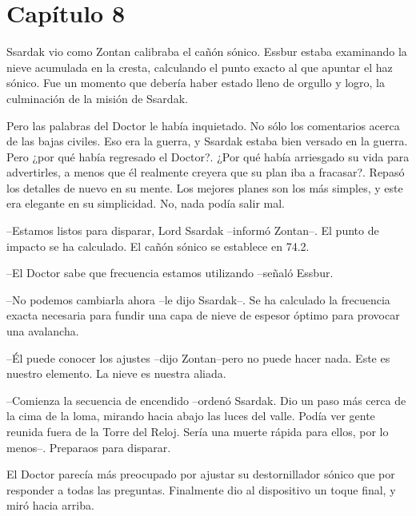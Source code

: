 \chapter*{Capítulo 8}

Ssardak vio como Zontan calibraba el cañón sónico. Essbur estaba examinando la nieve acumulada en la cresta, calculando el punto exacto al que apuntar el haz sónico. Fue un momento que debería haber estado lleno de orgullo y logro, la culminación de la misión de Ssardak.



Pero las palabras del Doctor le había inquietado. No sólo los comentarios acerca de las bajas civiles. Eso era la guerra, y Ssardak estaba bien versado en la guerra. Pero ¿por qué había regresado el Doctor?. ¿Por qué había arriesgado su vida para advertirles, a menos que él realmente creyera que su plan iba a fracasar?. Repasó los detalles de nuevo en su mente. Los mejores planes son los más simples, y este era elegante en su simplicidad. No, nada podía salir mal.



--Estamos listos para disparar, Lord Ssardak --informó Zontan--. El punto de impacto se ha calculado. El cañón sónico se establece en 74.2.



--El Doctor sabe que frecuencia estamos utilizando --señaló Essbur.



--No podemos cambiarla ahora --le dijo Ssardak--. Se ha calculado la frecuencia exacta necesaria para fundir una capa de nieve de espesor óptimo para provocar una avalancha.



--Él puede conocer los ajustes --dijo Zontan--pero no puede hacer nada. Este es nuestro elemento. La nieve es nuestra aliada. 



--Comienza la secuencia de encendido --ordenó Ssardak. Dio un paso más cerca de la cima de la loma, mirando hacia abajo las luces del valle. Podía ver gente reunida fuera de la Torre del Reloj. Sería una muerte rápida para ellos, por lo menos--. Preparaos para disparar.



\mbox{}



El Doctor parecía más preocupado por ajustar su destornillador sónico que por responder a todas las preguntas. Finalmente dio al dispositivo un toque final, y miró hacia arriba.



